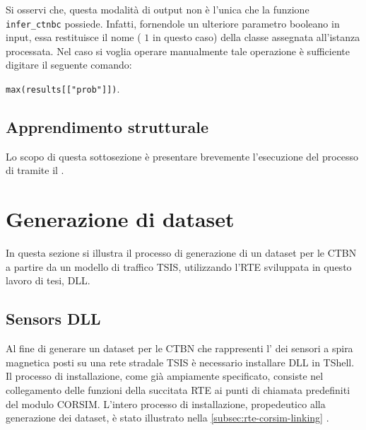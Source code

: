 Si osservi che, questa modalità di output non è l'unica che la funzione \lstinline[language=rstats]{infer_ctnbc} possiede. Infatti, fornendole un ulteriore parametro booleano in input, essa restituisce il nome (\ie{} $1$ in questo caso) della classe assegnata all'istanza processata. Nel caso si voglia operare manualmente tale operazione è sufficiente digitare il seguente comando:

\lstinline[language=rstats]{max(results[["prob"]])}.

\subsection{Apprendimento strutturale}
Lo scopo di questa sottosezione è presentare brevemente l'esecuzione del processo di \emph{} tramite il \pacchettor{}.




\section{Generazione di dataset}\label{sec:create-dataset-howto}
In questa sezione si illustra il processo di generazione di un dataset per le \acs{CTBN} a partire da un modello di traffico \acs{TSIS}, utilizzando l'\acl{RTE} sviluppata in questo lavoro di tesi,  \acs{DLL}.

\subsection{Sensors DLL}
Al fine di generare un dataset per le \acs{CTBN} che rappresenti l' dei sensori a spira magnetica posti su una rete stradale \acs{TSIS} è necessario installare  \acs{DLL} in \acs{TShell}. Il processo di installazione, come già ampiamente specificato, consiste nel collegamento delle funzioni della succitata \acs{RTE} ai punti di chiamata predefiniti del modulo \acs{CORSIM}. L'intero processo di installazione, propedeutico alla generazione dei dataset, è stato illustrato nella \autoref{subsec:rte-corsim-linking} .

